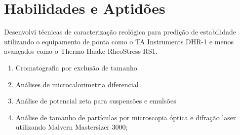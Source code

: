 \section{Habilidades e Aptidões}

{Desenvolvi técnicas de caracterização reológica para 
predição de estabilidade utilizando o 
equipamento de ponta como o TA Instruments DHR-1 e 
menos avançados como o Thermo Haake RheoStress RS1.}\hfill
{}\hfill

\hfill
{}


{
    \begin{enumerate}
        \item Cromatografia por exclusão de tamanho
        \item Análises de microcalorimetria diferencial
        \item Análise de potencial zeta para suspensões e emulsões
        \item Análise de tamanho de partículas por microscopia óptica e difração laser utilizando Malvern Mastersizer 3000;
    \end{enumerate}
    }\hfill
{}
    
